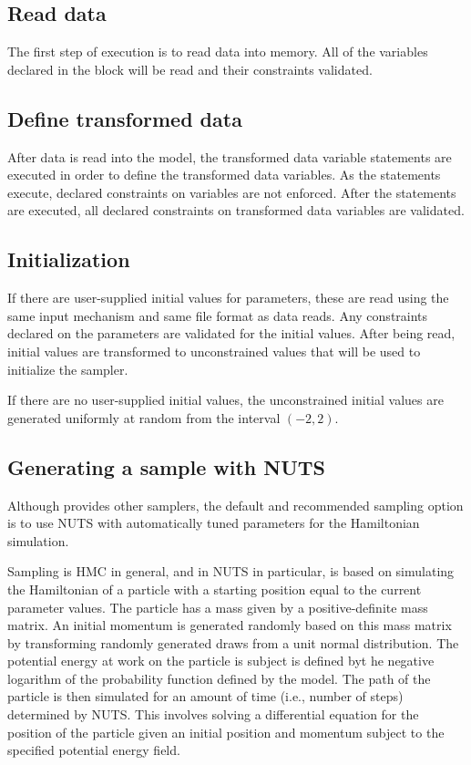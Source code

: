 \documentclass[article]{jss}
\begin{document}
\subsection{Read data}

The first step of execution is to read data into memory.  All of the
variables declared in the  block will be read and their
constraints validated.  

\subsection{Define transformed data}

After data is read into the model, the transformed data variable
statements are executed in order to define the transformed data
variables.  As the statements execute, declared constraints on
variables are not enforced.  After the statements are executed, all
declared constraints on transformed data variables are validated.

\subsection{Initialization}

If there are user-supplied initial values for parameters, these are
read using the same input mechanism and same file format as data
reads.  Any constraints declared on the parameters are validated for
the initial values.  After being read, initial values are transformed
to unconstrained values that will be used to initialize the sampler.

If there are no user-supplied initial values, the unconstrained
initial values are generated uniformly at random from the interval
$(-2,2)$.

\subsection{Generating a sample with NUTS}

Although  provides other samplers, the default and
recommended sampling option is to use NUTS with automatically tuned
parameters for the Hamiltonian simulation.

Sampling is HMC in general, and in NUTS in particular, is based on
simulating the Hamiltonian of a particle with a starting position
equal to the current parameter values.  The particle has a mass given
by a positive-definite mass matrix.  An initial momentum is generated
randomly based on this mass matrix by transforming randomly generated
draws from a unit normal distribution.  The potential energy at work
on the particle is subject is defined byt he negative logarithm of the
probability function defined by the model.  The path of the particle
is then simulated for an amount of time (i.e., number of steps)
determined by NUTS.  This involves solving a differential equation for
the position of the particle given an initial position and momentum
subject to the specified potential energy field.
\end{document}
